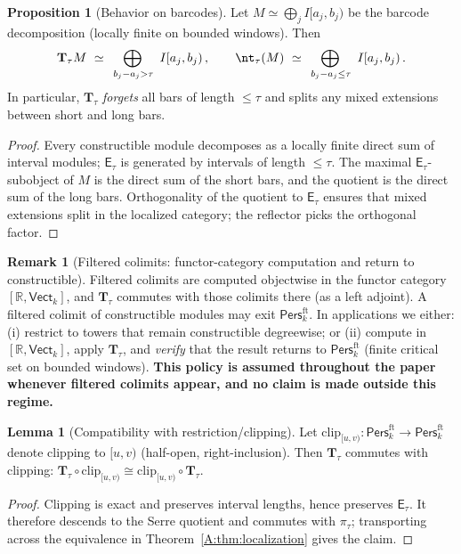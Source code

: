 \documentclass[11pt]{article}
\numberwithin{equation}{section}
\theoremstyle{plain}
\theoremstyle{definition}
\theoremstyle{remark}
\newcommand{\Pers}{\mathsf{Pers}}
\newcommand{\Vect}{\mathsf{Vect}}
\theoremstyle{plain}
\theoremstyle{definition}
\numberwithin{equation}{section}
\newtheorem{proposition}[theorem]{Proposition}
\newtheorem{lemma}[theorem]{Lemma}
\theoremstyle{definition}
\newtheorem{remark}[theorem]{Remark}
\numberwithin{equation}{section}
\theoremstyle{plain}
\theoremstyle{definition}
\theoremstyle{remark}
\newcommand{\clip}{\mathrm{clip}}
\providecommand{\n}{\unskip\space}
\begin{document}
\begin{proposition}[Behavior on barcodes]\label{A:prop:barcode-behavior}
Let \(M\simeq \bigoplus_{j} I[a_j,b_j)\) be the barcode decomposition (locally finite on bounded windows).
Then
\[
\mathbf{T}_\tau M\ \simeq\ \bigoplus_{\,b_j-a_j>\tau}\ I[a_j,b_j)\,,\n\qquad\nt_\tau(M)\ \simeq\ \bigoplus_{\,b_j-a_j\le \tau}\ I[a_j,b_j)\,.
\]
In particular, \(\mathbf{T}_\tau\) \emph{forgets} all bars of length \(\le\tau\) and splits any mixed extensions between short and long bars.
\end{proposition}

\begin{proof}
Every constructible module decomposes as a locally finite direct sum of interval modules; \(\mathsf{E}_\tau\) is generated by intervals of length \(\le\tau\).
The maximal \(\mathsf{E}_\tau\)-subobject of \(M\) is the direct sum of the short bars, and the quotient is the direct sum of the long bars. Orthogonality of the quotient to \(\mathsf{E}_\tau\) ensures that mixed extensions split in the localized category; the reflector picks the orthogonal factor.
\end{proof}

\begin{remark}[Filtered colimits: functor-category computation and return to constructible]
\label{A:rk:filtered-colimits}
Filtered colimits are computed objectwise in the functor category \([\mathbb{R},\Vect_k]\), and \(\mathbf{T}_\tau\) commutes with those colimits there (as a left adjoint).
A filtered colimit of constructible modules may exit \(\Pers^{\mathrm{ft}}_k\).
In applications we either: (i) restrict to towers that remain constructible degreewise; or (ii) compute in \([\mathbb{R},\Vect_k]\), apply \(\mathbf{T}_\tau\), and \emph{verify} that the result returns to \(\Pers^{\mathrm{ft}}_k\) (finite critical set on bounded windows).
\textbf{This policy is assumed throughout the paper whenever filtered colimits appear, and no claim is made outside this regime.}
\end{remark}

\begin{lemma}[Compatibility with restriction/clipping]\label{A:lem:clip}
Let \(\clip_{[u,v)}:\Pers^{\mathrm{ft}}_k\to\Pers^{\mathrm{ft}}_k\) denote clipping to \([u,v)\) (half-open, right-inclusion).
Then \(\mathbf{T}_\tau\) commutes with clipping: \(\mathbf{T}_\tau\circ \clip_{[u,v)} \cong \clip_{[u,v)}\circ \mathbf{T}_\tau\).
\end{lemma}

\begin{proof}
Clipping is exact and preserves interval lengths, hence preserves \(\mathsf{E}_\tau\). It therefore descends to the Serre quotient and commutes with \(\pi_\tau\); transporting across the equivalence in Theorem~\ref{A:thm:localization} gives the claim.
\end{proof}
\end{document}
